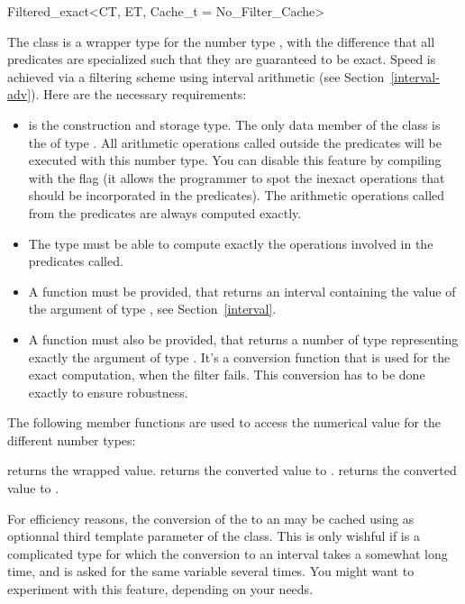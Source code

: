\begin{ccClassTemplate}{Filtered_exact<CT, ET, Cache_t = No_Filter_Cache>}
\label{filter}

The class  is a wrapper type for the number
type , with the difference
that all predicates are specialized such that they are guaranteed to be exact.
Speed is achieved via a filtering scheme using interval arithmetic (see
Section~\ref{interval-adv}).  Here are the necessary requirements:

\begin{itemize}
\item {} is the construction and storage type.  The only data member of
      the class  is the  of type
      .
      All arithmetic operations called
      outside the predicates will be executed with this number type.  You can
      disable this feature by compiling with the flag
       (it allows the programmer
      to spot the inexact operations that should be incorporated in the
      predicates).
      The arithmetic operations called from the predicates are always computed
      exactly.
\item The  type must be able to compute exactly the operations involved
      in the predicates called.
\item A  function must
      be provided, that returns an interval containing the value of the
      argument of type , see Section~\ref{interval}.
\item A  function must also be provided, that
      returns a number of type  representing exactly the argument of
      type .  It's a conversion function that is used for the exact
      computation, when the filter fails.
      This conversion has to be done exactly to ensure robustness.
\end{itemize}

The following member functions are used to access the numerical value for the
different number types:

 {returns the wrapped value.}
 {returns the converted value to .}
 {returns the converted value
                                             to .}

For efficiency reasons, the conversion of the  to an
 may be cached using  as optionnal
third template parameter of the class.  This is only wishful if  is a
complicated type for which the conversion to an interval takes a somewhat long
time, and is asked for the same variable several times.  You might want to
experiment with this feature, depending on your needs.


\end{ccClassTemplate}
